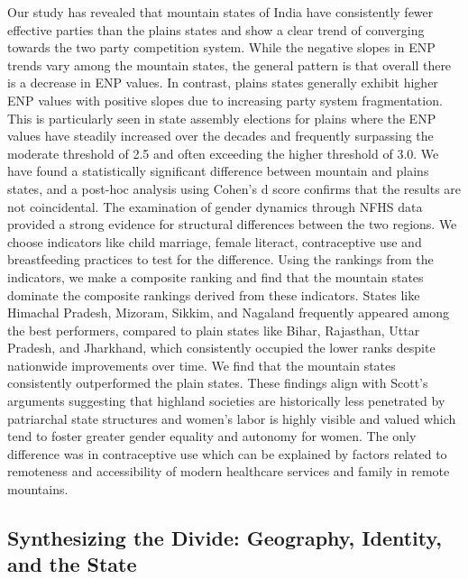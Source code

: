 Our study has revealed that mountain states of India have consistently fewer effective parties than the plains states and show a clear trend of converging towards the two party competition system. While the negative slopes in ENP trends vary among the mountain states, the general pattern is that overall there is a decrease in ENP values. In contrast, plains states generally exhibit higher ENP values with positive slopes due to increasing party system fragmentation. This is particularly seen in state assembly elections for plains where the ENP values have steadily increased over the decades and frequently surpassing the moderate threshold of 2.5 and often exceeding the higher threshold of 3.0. We have found a statistically significant difference between mountain and plains states, and a post-hoc analysis using Cohen’s d score confirms that the results are not coincidental. The examination of gender dynamics through NFHS data provided a strong evidence for structural differences between the two regions. We choose indicators like child marriage, female literact, contraceptive use and breastfeeding practices to test for the difference.  Using the rankings from the indicators, we make a composite ranking and find that the mountain states dominate the composite rankings derived from these indicators. States like Himachal Pradesh, Mizoram, Sikkim, and Nagaland frequently appeared among the best performers, compared to plain states like Bihar, Rajasthan, Uttar Pradesh, and Jharkhand, which consistently occupied the lower ranks despite nationwide improvements over time. We find that the mountain states consistently outperformed the plain states. These findings align with Scott's arguments suggesting that highland societies are historically less penetrated by patriarchal state structures and women's labor is highly visible and valued which tend to foster greater gender equality and autonomy for women. The only difference was in contraceptive use which can be explained by factors related to remoteness and accessibility of modern healthcare services and family in remote mountains. 

\subsection{Synthesizing the Divide: Geography, Identity, and the State
}

